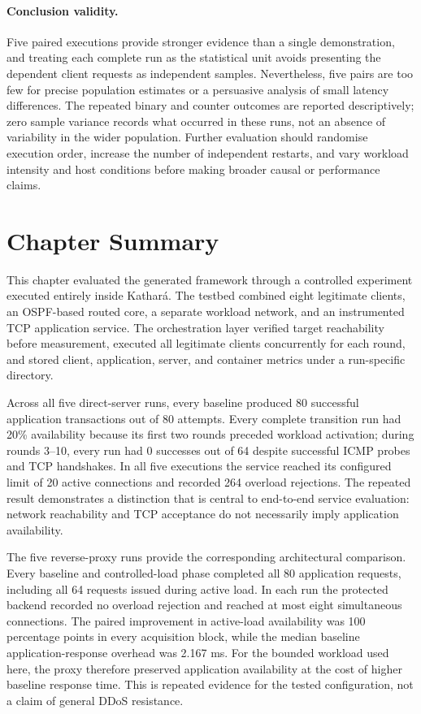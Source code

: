 \paragraph{Conclusion validity.}
Five paired executions provide stronger evidence than a single demonstration,
and treating each complete run as the statistical unit avoids presenting the
dependent client requests as independent samples. Nevertheless, five pairs are
too few for precise population estimates or a persuasive analysis of small
latency differences. The repeated binary and counter outcomes are reported
descriptively; zero sample variance records what occurred in these runs, not an
absence of variability in the wider population. Further evaluation should
randomise execution order, increase the number of independent restarts, and
vary workload intensity and host conditions before making broader causal or
performance claims.

\section{Chapter Summary}
\label{sec:experimental-summary}

This chapter evaluated the generated framework through a controlled experiment
executed entirely inside Kathar\'a. The testbed combined eight legitimate
clients, an OSPF-based routed core, a separate workload network, and an
instrumented TCP application service. The orchestration layer verified target
reachability before measurement, executed all legitimate clients concurrently
for each round, and stored client, application, server, and container metrics
under a run-specific directory.

Across all five direct-server runs, every baseline produced 80 successful
application transactions out of 80 attempts. Every complete transition run had
20\% availability because its first two rounds preceded workload activation;
during rounds 3--10, every run had 0 successes out of 64 despite successful
ICMP probes and TCP handshakes. In all five executions the service reached its
configured limit of 20 active connections and recorded 264 overload
rejections. The repeated result demonstrates a distinction that is central to
end-to-end service evaluation: network reachability and TCP acceptance do not
necessarily imply application availability.

The five reverse-proxy runs provide the corresponding architectural
comparison. Every baseline and controlled-load phase completed all 80
application requests, including all 64 requests issued during active load. In
each run the protected backend recorded no overload rejection and reached at
most eight simultaneous connections. The paired improvement in active-load
availability was 100 percentage points in every acquisition block, while the
median baseline application-response overhead was 2.167 ms. For the bounded
workload used here, the proxy therefore preserved application availability at
the cost of higher baseline response time. This is repeated evidence for the
tested configuration, not a claim of general DDoS resistance.

